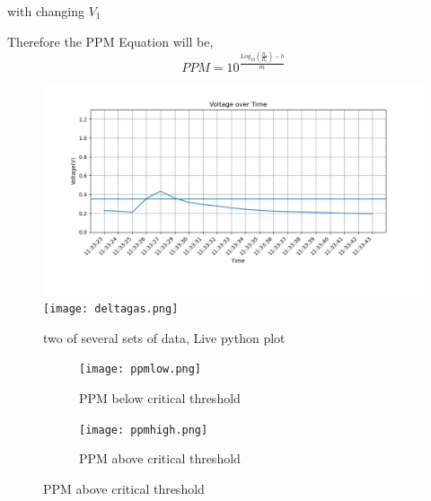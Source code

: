 				\begin{center}
				 with changing $V_1$ \\
				\end{center}
				Therefore the PPM Equation will be,\\
				\[PPM = 10^\frac{Log_10(\frac{R_s}{R_o})-b}{m}\]
				\begin{figure}[h]
					\centering
					\includegraphics[width=\linewidth]{thdDetect.png}
					\texttt{[image: deltagas.png]}
					\caption{two of several sets of data, Live python plot}
					\label{fig:angGraph}
				\end{figure}
				\begin{figure}[h]
					\centering
				\begin{subfigure}[t]{0.5\linewidth}
						\texttt{[image: ppmlow.png]}
						\caption{PPM below critical threshold}
				\end{subfigure}
				\begin{subfigure}[t]{0.5\linewidth}
					\texttt{[image: ppmhigh.png]}
					\caption{PPM above critical threshold}
				\end{subfigure}
				\end{figure}
			
				
		
	
